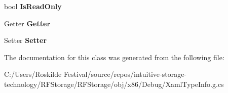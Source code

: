 \begin{DoxyCompactItemize}
bool {\bfseries Is\+Read\+Only}
\item 
\mbox{\label{class_r_f_storage_1_1_r_f_storage___xaml_type_info_1_1_xaml_member_ab5b8e6fa84ebf7db23c6eef8f7e24922}} 
Getter {\bfseries Getter}
\item 
\mbox{\label{class_r_f_storage_1_1_r_f_storage___xaml_type_info_1_1_xaml_member_a7cda4b109c95f7ed406ad29b1aabe936}} 
Setter {\bfseries Setter}
\end{DoxyCompactItemize}


The documentation for this class was generated from the following file\+:\begin{DoxyCompactItemize}
\item 
C\+:/\+Users/\+Roskilde Festival/source/repos/intuitive-\/storage-\/technology/\+R\+F\+Storage/\+R\+F\+Storage/obj/x86/\+Debug/Xaml\+Type\+Info.\+g.\+cs\end{DoxyCompactItemize}
